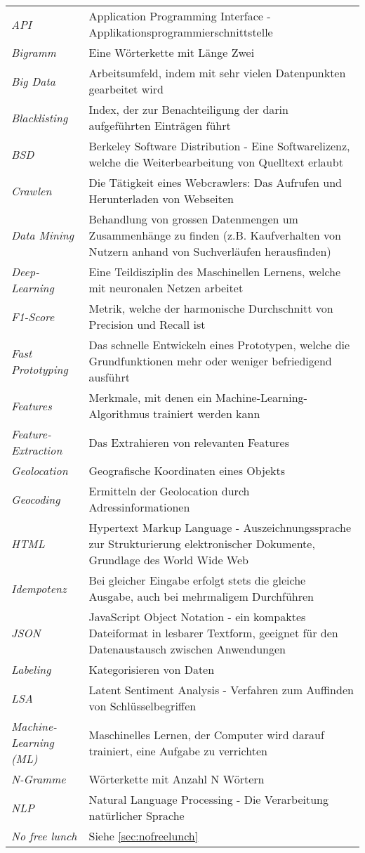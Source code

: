 \begin{table}[H]
	\begin{tabular}{>{\em}p{4cm}p{12cm}}
		API & Application Programming Interface - Applikationsprogrammierschnittstelle\\
		Bigramm & Eine Wörterkette mit Länge Zwei\\
		Big Data & Arbeitsumfeld, indem mit sehr vielen Datenpunkten gearbeitet wird\\
		Blacklisting & Index, der zur Benachteiligung der darin aufgeführten Einträgen führt\\
		BSD & Berkeley Software Distribution - Eine Softwarelizenz, welche die Weiterbearbeitung von Quelltext erlaubt\\
		Crawlen & Die Tätigkeit eines Webcrawlers: Das Aufrufen und Herunterladen von Webseiten\\
		Data Mining & Behandlung von grossen Datenmengen um Zusammenhänge zu finden (z.B. Kaufverhalten von Nutzern anhand von Suchverläufen herausfinden)\\
		Deep-Learning & Eine Teildisziplin des Maschinellen Lernens, welche mit neuronalen Netzen arbeitet\\
		F1-Score & Metrik, welche der harmonische Durchschnitt von Precision und Recall ist\\
		Fast Prototyping & Das schnelle Entwickeln eines Prototypen, welche die Grundfunktionen mehr oder weniger befriedigend ausführt\\
		Features & Merkmale, mit denen ein Machine-Learning-Algorithmus trainiert werden kann\\
		Feature-Extraction & Das Extrahieren von relevanten Features\\
		Geolocation & Geografische Koordinaten eines Objekts\\
		Geocoding & Ermitteln der Geolocation durch Adressinformationen\\
		HTML & Hypertext Markup Language - Auszeichnungssprache zur Strukturierung elektronischer Dokumente, Grundlage des World Wide Web\\
		Idempotenz & Bei gleicher Eingabe erfolgt stets die gleiche Ausgabe, auch bei mehrmaligem Durchführen\\
		JSON & JavaScript Object Notation - ein kompaktes Dateiformat in lesbarer Textform, geeignet für den Datenaustausch zwischen Anwendungen\\
		Labeling & Kategorisieren von Daten\\
		LSA & Latent Sentiment Analysis - Verfahren zum Auffinden von Schlüsselbegriffen\\
		Machine-Learning (ML) & Maschinelles Lernen, der Computer wird darauf trainiert, eine Aufgabe zu verrichten\\
		N-Gramme & Wörterkette mit Anzahl N Wörtern\\
		NLP & Natural Language Processing - Die Verarbeitung natürlicher Sprache\\
		No free lunch & Siehe \cref{sec:nofreelunch}\\
		
	\end{tabular}
\end{table}
